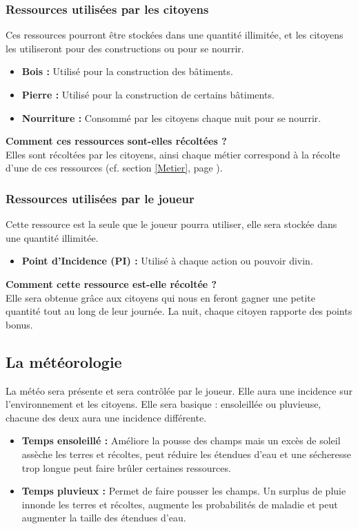 \documentclass[a4paper]{article}
\newcommand{\alinea}{\hspace*{0.5cm}}
\begin{document}
        \subsubsection{Ressources utilisées par les citoyens}
          \alinea Ces ressources pourront être stockées dans une quantité illimitée, et les citoyens les utiliseront pour des constructions ou pour se nourrir.
          \begin{itemize} \small
            \item \textbf{Bois :} Utilisé pour la construction des bâtiments.
            \item \textbf{Pierre :} Utilisé pour la construction de certains bâtiments.
            \item \textbf{Nourriture :} Consommé par les citoyens chaque nuit pour se nourrir.
          \end{itemize} \normalsize
          \textbf{Comment ces ressources sont-elles récoltées ? }\\
          \alinea Elles sont récoltées par les citoyens, ainsi chaque métier correspond à la récolte d'une de ces ressources (cf. section \ref{Metier}, page \pageref{Metier}).

        \subsubsection{Ressources utilisées par le joueur}
          \alinea Cette ressource est la seule que le joueur pourra utiliser, elle sera stockée dans une quantité illimitée.
          \begin{itemize} \small
            \item \textbf{Point d'Incidence (PI) :} Utilisé à chaque action ou pouvoir divin.
          \end{itemize} \normalsize
          \textbf{Comment cette ressource est-elle récoltée ? }\\
          \alinea Elle sera obtenue grâce aux citoyens qui nous en feront gagner une petite quantité tout au long de leur journée. La nuit, chaque citoyen rapporte des points bonus.

	\subsection{La météorologie}
	  \alinea La météo sera présente et sera contrôlée par le joueur. Elle aura une incidence sur l'environnement et les citoyens. Elle sera basique : ensoleillée ou pluvieuse, chacune des deux aura une incidence différente. 
	  \begin{itemize} \small
		\item \textbf{Temps ensoleillé :} Améliore la pousse des champs mais un excès de soleil assèche les terres et récoltes, peut réduire les étendues d'eau et une sécheresse trop longue peut faire brûler certaines ressources.
		\item \textbf{Temps pluvieux :} Permet de faire pousser les champs. Un surplus de pluie innonde les terres et récoltes, augmente les probabilités de maladie et peut augmenter la taille des étendues d'eau.
	  \end{itemize} \normalsize
\end{document}
